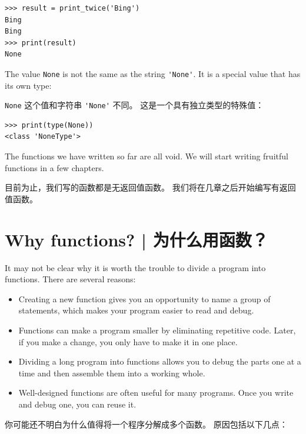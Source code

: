 \begin{lstlisting}
>>> result = print_twice('Bing')
Bing
Bing
>>> print(result)
None
\end{lstlisting}
%
The value {\tt None} is not the same as the string \verb"'None'".
It is a special value that has its own type:

\lstinline{None} 这个值和字符串 \lstinline{'None'} 不同。 这是一个具有独立类型的特殊值：


\begin{lstlisting}
>>> print(type(None))
<class 'NoneType'>
\end{lstlisting}
%
The functions we have written so far are all void.  We will start
writing fruitful functions in a few chapters.

目前为止，我们写的函数都是无返回值函数。
我们将在几章之后开始编写有返回值函数。
  


%
\section{Why functions?  |  为什么用函数？}

It may not be clear why it is worth the trouble to divide
a program into functions.  There are several reasons:

\begin{itemize}

\item Creating a new function gives you an opportunity to name a group
of statements, which makes your program easier to read and debug.

\item Functions can make a program smaller by eliminating repetitive
code.  Later, if you make a change, you only have
to make it in one place.

\item Dividing a long program into functions allows you to debug the
parts one at a time and then assemble them into a working whole.

\item Well-designed functions are often useful for many programs.
Once you write and debug one, you can reuse it.

\end{itemize}

你可能还不明白为什么值得将一个程序分解成多个函数。 原因包括以下几点：

